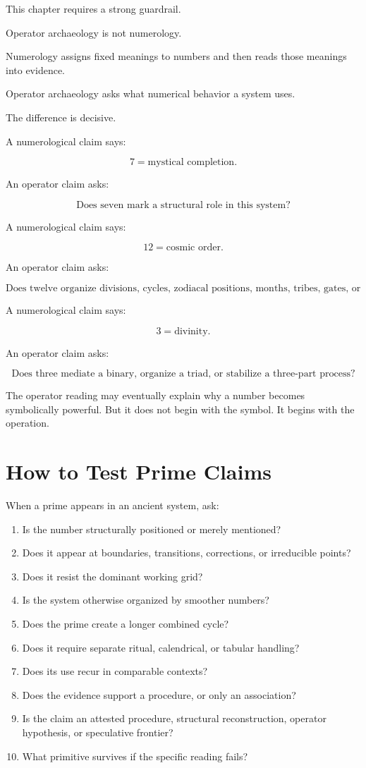 \documentclass[11pt]{book}
\begin{document}
This chapter requires a strong guardrail.

Operator archaeology is not numerology.

Numerology assigns fixed meanings to numbers and then reads those meanings into evidence.

Operator archaeology asks what numerical behavior a system uses.

The difference is decisive.

A numerological claim says:

\[
7 = \text{mystical completion}.
\]

An operator claim asks:

\[
\text{Does seven mark a structural role in this system?}
\]

A numerological claim says:

\[
12 = \text{cosmic order}.
\]

An operator claim asks:

\[
\text{Does twelve organize divisions, cycles, zodiacal positions, months, tribes, gates, or measures?}
\]

A numerological claim says:

\[
3 = \text{divinity}.
\]

An operator claim asks:

\[
\text{Does three mediate a binary, organize a triad, or stabilize a three-part process?}
\]

The operator reading may eventually explain why a number becomes symbolically powerful. But it does not begin with the symbol. It begins with the operation.

\section{How to Test Prime Claims}

When a prime appears in an ancient system, ask:

\begin{enumerate}[label=\arabic*.]
    \item Is the number structurally positioned or merely mentioned?
    \item Does it appear at boundaries, transitions, corrections, or irreducible points?
    \item Does it resist the dominant working grid?
    \item Is the system otherwise organized by smoother numbers?
    \item Does the prime create a longer combined cycle?
    \item Does it require separate ritual, calendrical, or tabular handling?
    \item Does its use recur in comparable contexts?
    \item Does the evidence support a procedure, or only an association?
    \item Is the claim an attested procedure, structural reconstruction, operator hypothesis, or speculative frontier?
    \item What primitive survives if the specific reading fails?
\end{enumerate}
\end{document}
